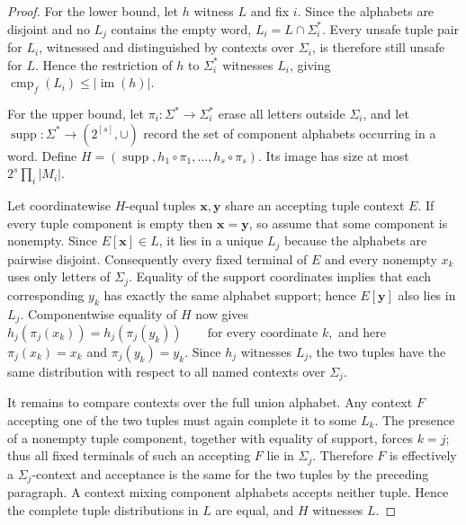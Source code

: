 \documentclass[10pt,a4paper]{article}
\theoremstyle{definition}
\theoremstyle{remark}
\newcommand{\cmp}{\operatorname{cmp}}
\begin{document}
\begin{proof}
For the lower bound, let \(h\) witness \(L\) and fix \(i\). Since the
alphabets are disjoint and no \(L_j\) contains the empty word,
\(L_i=L\cap\Sigma_i^*\). Every unsafe tuple pair for \(L_i\), witnessed and
distinguished by contexts over \(\Sigma_i\), is therefore still unsafe for
\(L\). Hence the
restriction of \(h\) to \(\Sigma_i^*\) witnesses \(L_i\), giving
\(
\cmp_f(L_i)\le |\operatorname{im}(h)|.
\)

For the upper bound, let
\(\pi_i:\Sigma^*\to\Sigma_i^*\) erase all letters outside \(\Sigma_i\), and
let
\(
\operatorname{supp}:\Sigma^*\longrightarrow(2^{[s]},\cup)
\)
record the set of component alphabets occurring in a word. Define
\(
H=(\operatorname{supp},h_1\circ\pi_1,\ldots,h_s\circ\pi_s).
\)
Its image has size at most \(2^s\prod_i|M_i|\).

Let coordinatewise \(H\)-equal tuples \(\mathbf x,\mathbf y\) share an
accepting tuple context \(E\). If every tuple component is empty then
\(\mathbf x=\mathbf y\), so assume that some component is nonempty. Since
\(E[\mathbf x]\in L\), it lies in a unique \(L_j\) because the alphabets are
pairwise disjoint. Consequently every fixed terminal of \(E\) and every
nonempty \(x_k\) uses only letters of \(\Sigma_j\). Equality of the support
coordinates implies that each corresponding \(y_k\) has exactly the same
alphabet support; hence \(E[\mathbf y]\) also lies in \(L_j\).
Componentwise equality of \(H\) now gives
\(
h_j(\pi_j(x_k))=h_j(\pi_j(y_k))
\qquad\text{for every coordinate }k,
\)
and here \(\pi_j(x_k)=x_k\) and \(\pi_j(y_k)=y_k\). Since \(h_j\) witnesses
\(L_j\), the two tuples have the same distribution with respect to all named
contexts over \(\Sigma_j\).

It remains to compare contexts over the full union alphabet. Any context
\(F\) accepting one of the two tuples must again complete it to some \(L_k\).
The presence of a nonempty tuple component, together with equality of support,
forces \(k=j\); thus all fixed terminals of such an accepting \(F\) lie in
\(\Sigma_j\). Therefore \(F\) is effectively a \(\Sigma_j\)-context and
acceptance is the same for the two tuples by the preceding paragraph. A
context mixing component alphabets accepts neither tuple. Hence the complete
tuple distributions in \(L\) are equal, and \(H\) witnesses \(L\).
\end{proof}
\end{document}
